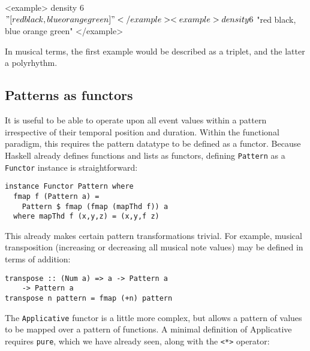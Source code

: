 \documentclass[authoryear,preprint]{sigplanconf}
\begin{document}
<example>
density 6 $ "[red black, blue orange green]"
</example>


<example>
density 6 $ "{red black, blue orange green}"
</example>

In musical terms, the first example would be described as a triplet,
and the latter a polyrhythm.

\subsection{Patterns as functors}

It is useful to be able to operate upon all event values within a
pattern irrespective of their temporal position and duration. Within
the functional paradigm, this requires the pattern datatype to be
defined as a functor. Because Haskell already defines functions and
lists as functors, defining \lstinline{Pattern} as a
\lstinline{Functor} instance is straightforward:

\begin{center}
\begin{minipage}{0.5\textwidth}
\begin{lstlisting}
instance Functor Pattern where
  fmap f (Pattern a) = 
    Pattern $ fmap (fmap (mapThd f)) a
  where mapThd f (x,y,z) = (x,y,f z)
\end{lstlisting}
\end{minipage}
\end{center}

This already makes certain pattern transformations trivial. For
example, musical transposition (increasing or decreasing all musical
note values) may be defined in terms of addition:

\begin{center}
\begin{minipage}{0.5\textwidth}
\begin{lstlisting}
transpose :: (Num a) => a -> Pattern a 
    -> Pattern a
transpose n pattern = fmap (+n) pattern
\end{lstlisting}
\end{minipage}
\end{center}

The \lstinline{Applicative} functor is a little more complex, but
allows a pattern of values to be mapped over a pattern of functions. A
minimal definition of Applicative requires \lstinline{pure}, which we
have already seen, along with the \lstinline{<*>} operator:
\end{document}
